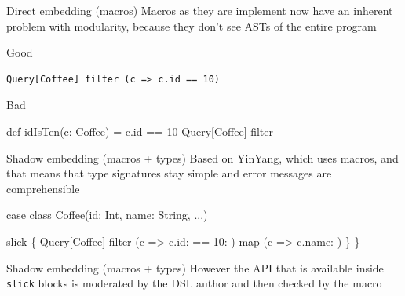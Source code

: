 \documentclass{beamer}
\begin{document}
\begin{frame}[fragile]{Direct embedding (macros)}
  Macros as they are implement now have an inherent problem with modularity,
  because they don't see ASTs of the entire program

  \vspace{1em}
  \begin{exampleblock}{Good}
    \begin{verbatim}
Query[Coffee] filter (c => c.id == 10)\end{verbatim}
  \end{exampleblock}

  \vspace{1em}
  \begin{alertblock}{Bad}
    \begin{semiverbatim}
def idIsTen(c: Coffee) = c.id == 10
Query[Coffee] filter \text{\color{blue}{idIsTen}}
    \end{semiverbatim}
  \end{alertblock}
\end{frame}

\begin{frame}[fragile]{Shadow embedding (macros + types)}
  Based on YinYang, which uses macros, and that means that
  type signatures stay simple and error messages are comprehensible

  \vspace{1em}
  \begin{semiverbatim}
case class Coffee(id: Int, name: String, ...)

slick \{
  Query[Coffee] filter
    (c => c.id: \text{\color{blue}{Int}} == 10: \text{\color{blue}{Int}}) map
    (c => c.name: \text{\color{blue}{String}})
  \}
\}\end{semiverbatim}
\end{frame}

\begin{frame}[fragile]{Shadow embedding (macros + types)}
  However the API that is available inside \texttt{slick} blocks
  is moderated by the DSL author and then checked by the macro

  \vspace{1em}
  \begin{semiverbatim}
  \text{\color{red}{Need an example from Vojin here}}
  \end{semiverbatim}
\end{frame}
\end{document}
